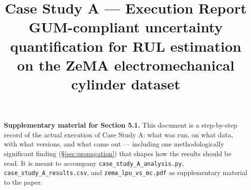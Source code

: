 \documentclass[11pt]{article}
\title{Case Study A --- Execution Report\\[6pt]
\large GUM-compliant uncertainty quantification for RUL estimation\\
on the ZeMA electromechanical cylinder dataset}
\author{}
\date{}
\begin{document}
\maketitle

\noindent\textbf{Supplementary material for Section 5.1.} This document is a
step-by-step record of the actual execution of Case Study A: what was run, on
what data, with what versions, and what came out --- including one
methodologically significant finding (\S\ref{sec:propagation}) that shapes
how the results should be read. It is meant to accompany
\texttt{case\_\allowbreak study\_\allowbreak A\_\allowbreak analysis.py}, \texttt{case\_\allowbreak study\_\allowbreak A\_\allowbreak results.csv},
and \texttt{zema\_\allowbreak lpu\_\allowbreak vs\_\allowbreak mc.pdf} as supplementary material to the paper.
\end{document}
